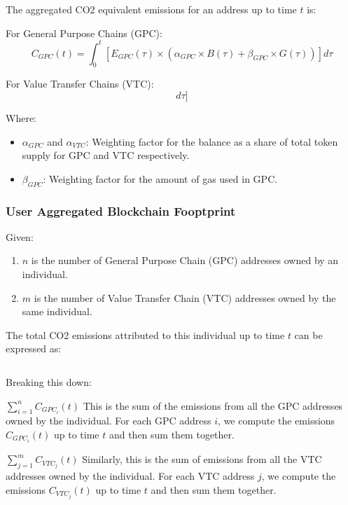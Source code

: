 \documentclass{article}
\begin{document}
The aggregated CO2 equivalent emissions for an address up to time $t$ is:

For General Purpose Chains (GPC):
\begin{equation}
    C_{GPC}(t) = \int_{0}^{t} [E_{GPC}(\tau) \times (\alpha_{GPC} \times B(\tau) + \beta_{GPC} \times G(\tau))] d\tau
\end{equation}

For Value Transfer Chains (VTC):
\begin{equation}
    [ C_{VTC}(t) = \int_{0}^{t} [E_{VTC}(\tau) \times (\alpha_{VTC} \times B(\tau) + \gamma_{VTC} \times T(\tau))] d\tau ]
\end{equation}

Where:
\begin{itemize}
    \item $\alpha_{GPC}$ and $\alpha_{VTC}$: Weighting factor for the balance as a share of total token supply for GPC and VTC respectively.
    \item $\beta_{GPC}$: Weighting factor for the amount of gas used in GPC.
\end{itemize}

\subsubsection{User Aggregated Blockchain Fooptprint}

Given:
\begin{enumerate}
    \item  \( n \) is the number of General Purpose Chain (GPC) addresses owned by an individual. 
    \item \( m \) is the number of Value Transfer Chain (VTC) addresses owned by the same individual.
\end{enumerate}

The total CO2 emissions attributed to this individual up to time \( t \) can be expressed as:

\begin{equation}
    [ C_{total}(t) = \sum_{i=1}^{n} C_{GPC_i}(t) + \sum_{j=1}^{m} C_{VTC_j}(t) ]
\end{equation}

Breaking this down: \\
\boldmath
\begin{description}
    \item \( \sum_{i=1}^{n} C_{GPC_i}(t) \) 
    This is the sum of the emissions from all the GPC addresses owned by the individual. For each GPC address \( i \), we compute the emissions \( C_{GPC_i}(t) \) up to time \( t \) and then sum them together.
    \item \( \sum_{j=1}^{m} C_{VTC_j}(t) \) 
    Similarly, this is the sum of emissions from all the VTC addresses owned by the individual. For each VTC address \( j \), we compute the emissions \( C_{VTC_j}(t) \) up to time \( t \) and then sum them together.

\end{description}
\unboldmath
\end{document}
